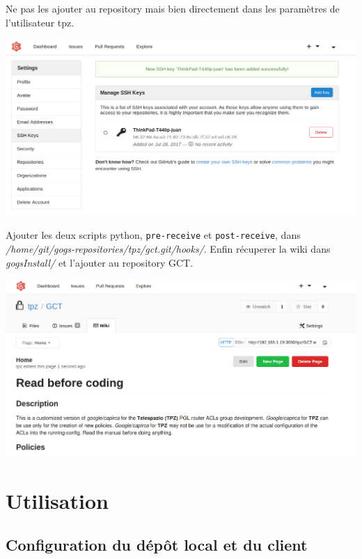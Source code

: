 \documentclass{article}
\begin{document}
        Ne pas les ajouter au repository mais bien directement dans les paramètres de l'utilisateur tpz.
\begin{center}
        \includegraphics[scale=0.2]{sshkeys.png}\smallbreak
\end{center}
        Ajouter les deux scripts python, \texttt{pre-receive} et \texttt{post-receive}, dans \textit{/home/git/gogs-repositories/tpz/gct.git/hooks/}.
        Enfin récuperer la wiki dans \textit{gogsInstall/} et l'ajouter au repository GCT.
\begin{center}
        \includegraphics[scale=0.2]{wikiGCT.png}\smallbreak
\end{center}

  \section{Utilisation}
    \subsection{Configuration du dépôt local et du client}
\end{document}
